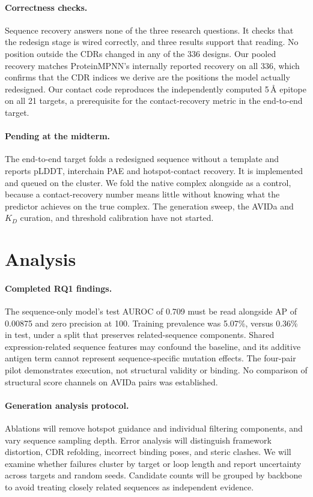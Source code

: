 \documentclass[11pt, logo, nonumbering]{preprint}
\begin{document}
\paragraph{Correctness checks.} Sequence recovery answers none of the three
research questions. It checks that the redesign stage is wired correctly, and
three results support that reading. No position outside the CDRs changed in any
of the 336 designs. Our pooled recovery matches ProteinMPNN's internally
reported recovery on all 336, which confirms that the CDR indices we derive are
the positions the model actually redesigned. Our contact code reproduces the
independently computed 5\,\AA{} epitope on all 21 targets, a prerequisite for
the contact-recovery metric in the end-to-end target.

\paragraph{Pending at the midterm.} The end-to-end target folds a redesigned sequence
without a template and reports pLDDT, interchain PAE and hotspot-contact
recovery. It is implemented and queued on the cluster. We fold the native
complex alongside as a control, because a contact-recovery number means little
without knowing what the predictor achieves on the true complex. The generation
sweep, the AVIDa and $K_D$ curation, and threshold calibration have not started.

\section{Analysis}
\label{sec:analysis}
\paragraph{Completed RQ1 findings.}
The sequence-only model's test AUROC of 0.709 must be read alongside AP of
0.00875 and zero precision at 100. Training prevalence was 5.07\%, versus
0.36\% in test, under a split that preserves related-sequence components.
Shared expression-related sequence features may confound the baseline, and
its additive antigen term cannot represent sequence-specific mutation effects.
The four-pair pilot demonstrates execution, not structural validity or binding.
No comparison of structural score channels on AVIDa pairs was established.

\paragraph{Generation analysis protocol.}
Ablations will remove hotspot guidance and individual filtering components, and vary sequence sampling depth. Error analysis will distinguish framework distortion, CDR refolding, incorrect binding poses, and steric clashes. We will examine whether failures cluster by target or loop length and report uncertainty across targets and random seeds. Candidate counts will be grouped by backbone to avoid treating closely related sequences as independent evidence.
\end{document}
